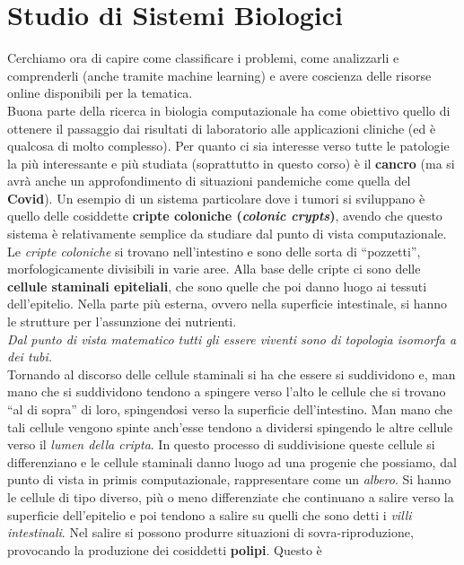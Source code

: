 \documentclass[a4paper,12pt, oneside]{book}
\begin{document}
\chapter{Studio di Sistemi Biologici}
Cerchiamo ora di capire come classificare i problemi, come analizzarli e
comprenderli (anche tramite machine learning) e avere coscienza delle risorse
online disponibili per la tematica.\\
Buona parte della ricerca in biologia computazionale ha come obiettivo quello di
ottenere il passaggio dai risultati di laboratorio alle applicazioni cliniche
(ed è qualcosa di molto complesso). Per quanto ci sia interesse verso tutte le
patologie la più interessante e più studiata (soprattutto in questo corso) è il
\textbf{cancro} (ma si avrà anche un approfondimento di situazioni pandemiche
come quella del \textbf{Covid}). Un esempio di un sistema particolare dove i
tumori si 
sviluppano è quello delle cosiddette \textbf{cripte coloniche (\textit{colonic
    crypts})}, avendo che questo sistema è relativamente semplice da studiare
dal punto di vista computazionale.\\
Le \textit{cripte coloniche} si trovano nell'intestino e sono delle sorta di
``pozzetti'', morfologicamente divisibili in varie aree.
Alla base delle cripte ci sono delle \textbf{cellule staminali epiteliali}, che
sono quelle che poi danno luogo ai tessuti dell'epitelio. Nella parte più
esterna, ovvero nella superficie intestinale, si hanno le strutture per
l'assunzione dei nutrienti.\\
\textit{Dal punto di vista matematico tutti gli essere viventi sono di topologia
isomorfa a dei tubi.}\\
Tornando al discorso delle cellule staminali si ha che essere si suddividono e,
man mano che si suddividono tendono a spingere verso l'alto le cellule che si
trovano ``al di sopra'' di loro, spingendosi verso la superficie
dell'intestino. Man mano che tali cellule vengono spinte 
anch'esse tendono a dividersi spingendo le altre cellule verso il \textit{lumen
  della cripta}. In questo processo di suddivisione queste cellule si
differenziano e le cellule staminali danno luogo ad una progenie che possiamo,
dal punto di vista in primis computazionale, rappresentare come un
\textit{albero}. Si hanno le cellule di tipo diverso, più o meno
differenziate che continuano a salire verso la superficie dell'epitelio e poi
tendono a salire su quelli che sono detti i \textit{villi intestinali}. Nel
salire si possono produrre situazioni di sovra-riproduzione, provocando la
produzione dei cosiddetti \textbf{polipi}. Questo è
\end{document}

